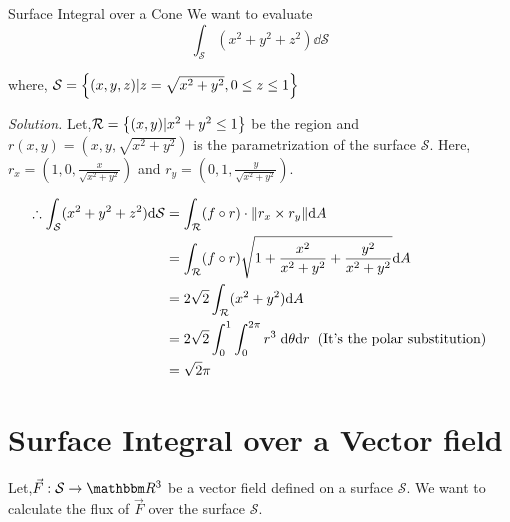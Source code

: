 \documentclass[../Analysis-3]{subfiles}
\begin{document}
\begin{Eg}{Surface Integral over a Cone}{}
    We want to evaluate \[ \int_{\mathcal{S}}(x^2+y^2+z^2) \dd \mathcal{S}\]

    where, $\mathcal{S} = \qty{(x,y,z) | z = \sqrt{x^2 + y^2},0 \le z \le 1}$

    \textit{Solution.} Let,$\mathcal{R} = \qty{(x,y)| x^2+y^2 \le 1}$ be the region and $r(x,y) = (x,y,\sqrt{x^2+y^2})$ is the parametrization of the surface $\mathcal{S}$. Here, $r_x = (1,0, \frac{x}{\sqrt{x^2+y^2}})$ and $r_y = (0,1,\frac{y}{\sqrt{x^2+y^2}})$.


    \begin{align*}
        \therefore \int_{\mathcal{S}}(x^2+y^2+z^2) \dd \mathcal{S} & = \int_{\mathcal{R}} (f\circ r) \cdot \norm{r_x \times r_y} \dd A                                                                \\
                                                                   & = \int_{\mathcal{R}} (f\circ r) \sqrt{1 + \frac{x^2}{x^2+y^2} + \frac{y^2}{x^2+y^2}} \dd A                                       \\
                                                                   & = 2\sqrt{2} \int_{\mathcal{R}} (x^2+y^2) \dd A                                                                                   \\
                                                                   & = 2\sqrt{2} \int_{0}^{1} \int_{0}^{2\pi} r^3 \hspace{0.1cm} \dd \theta \dd r \hspace{0.2cm} (\text{It's the polar substitution}) \\
                                                                   & = \sqrt{2} \pi
    \end{align*}

\end{Eg}

\section{Surface Integral over a Vector field}

Let,$\vec{F} : \mathcal{S} \to \R^3$ be a vector field defined on a surface $\mathcal{S}$. We want to calculate the flux of $\vec{F}$ over the surface $\mathcal{S}$.
\end{document}
